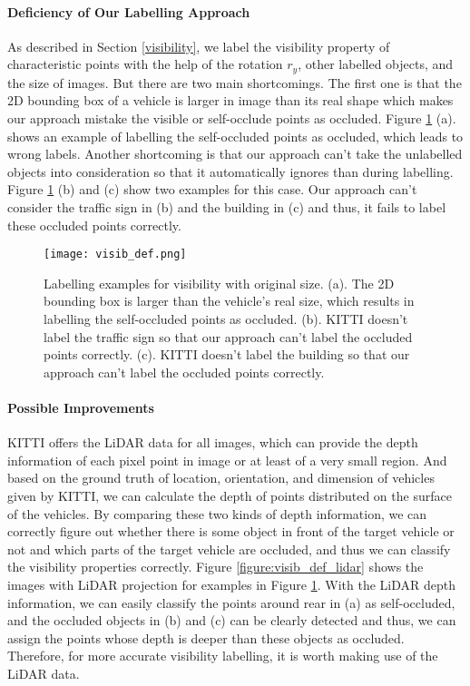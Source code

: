 \paragraph{Deficiency of Our Labelling Approach}
As described in Section \ref{visibility}, we label the visibility property of characteristic points with the help of the rotation $r_y$, other labelled objects, and the size of images. But there are two main shortcomings. The first one is that the 2D bounding box of a vehicle is larger in image than its real shape which makes our approach mistake the visible or self-occlude points as occluded. Figure \ref{figure:visib_def} (a). shows an example of labelling the self-occluded points as occluded, which leads to wrong labels. Another shortcoming is that our approach can't take the unlabelled objects into consideration so that it automatically ignores than during labelling. Figure \ref{figure:visib_def} (b) and (c) show two examples for this case. Our approach can't consider the traffic sign in (b) and the building in (c) and thus, it fails to label these occluded points correctly.

\begin{figure}[H]		
	\texttt{[image: visib\_def.png]}
	\caption{Labelling examples for visibility with original size. (a). The 2D bounding box is larger than the vehicle's real size, which results in labelling the self-occluded points as occluded. (b). KITTI doesn't label the traffic sign so that our approach can't label the occluded points correctly. (c). KITTI doesn't label the building so that our approach can't label the occluded points correctly.}
	\centering
	\label{figure:visib_def}
\end{figure}

\paragraph{Possible Improvements}

KITTI offers the LiDAR data for all images, which can provide the depth information of each pixel point in image or at least of a very small region. And based on the ground truth of location, orientation, and dimension of vehicles given by KITTI, we can calculate the depth of points distributed on the surface of the vehicles. By comparing these two kinds of depth information, we can correctly figure out whether there is some object in front of the target vehicle or not and which parts of the target vehicle are occluded, and thus we can classify the visibility properties correctly. Figure \ref{figure:visib_def_lidar} shows the images with LiDAR projection for examples in Figure \ref{figure:visib_def}. With the LiDAR depth information, we can easily classify the points around rear in (a) as self-occluded, and the occluded objects in (b) and (c) can be clearly detected and thus, we can assign the points whose depth is deeper than these objects as occluded. Therefore, for more accurate visibility labelling, it is worth making use of the LiDAR data.

